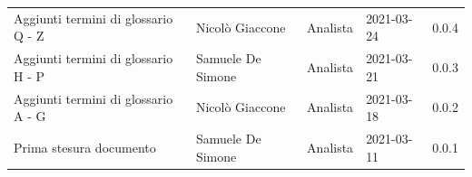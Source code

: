 \documentclass[a4paper]{article}
\begin{document}
\begin{center}
\begin{table}[h!]
\begin{tabular}{p{150px} p{90px} p{60px} p{60px} p{45px}}
            Aggiunti termini di glossario Q - Z                         & Nicolò Giaccone   & Analista       & 2021-03-24    & 0.0.4             \\
            Aggiunti termini di glossario H - P                         & Samuele De Simone & Analista       & 2021-03-21    & 0.0.3             \\
            Aggiunti termini di glossario A - G                         & Nicolò Giaccone   & Analista       & 2021-03-18    & 0.0.2             \\
            Prima stesura documento                                     & Samuele De Simone & Analista       & 2021-03-11    & 0.0.1             \\
        \end{tabular}
    \end{table}
\end{center}

\newpage
\tableofcontents
\newpage
\appendix


























\end{document}

